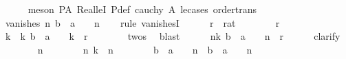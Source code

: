 \begin{isabellebody}
\ \ \ \ \isamarkupfalse%
\ {\isacharparenleft}{\kern0pt}meson\ PA\ Real{\isacharunderscore}{\kern0pt}leI\ P{\isacharunderscore}{\kern0pt}def\ {\isacartoucheopen}cauchy\ A{\isacartoucheclose}\ le{\isacharunderscore}{\kern0pt}cases\ order{\isachardot}{\kern0pt}trans{\isacharparenright}{\kern0pt}\isanewline
\ \ \isamarkupfalse%
\ \isamarkupfalse%
\ {\isachardoublequoteopen}vanishes\ {\isacharparenleft}{\kern0pt}{\isasymlambda}n{\isachardot}{\kern0pt}\ {\isacharparenleft}{\kern0pt}b\ {\isacharminus}{\kern0pt}\ a{\isacharparenright}{\kern0pt}\ {\isacharslash}{\kern0pt}\ {}\ {\isacharcircum}{\kern0pt}\ n{\isacharparenright}{\kern0pt}{\isachardoublequoteclose}\isanewline
\ \ \isamarkupfalse%
\ {\isacharparenleft}{\kern0pt}rule\ vanishesI{\isacharparenright}{\kern0pt}\isanewline
\ \ \ \ \isamarkupfalse%
\ r\ {\isacharcolon}{\kern0pt}{\isacharcolon}{\kern0pt}\ rat\isanewline
\ \ \ \ \isamarkupfalse%
\ {\isachardoublequoteopen}{}\ {\isacharless}{\kern0pt}\ r{\isachardoublequoteclose}\isanewline
\ \ \ \ \isamarkupfalse%
\ \isamarkupfalse%
\ k\ \ k{\isacharcolon}{\kern0pt}\ {\isachardoublequoteopen}{\isasymbar}b\ {\isacharminus}{\kern0pt}\ a{\isasymbar}\ {\isacharslash}{\kern0pt}\ {}\ {\isacharcircum}{\kern0pt}\ k\ {\isacharless}{\kern0pt}\ r{\isachardoublequoteclose}\isanewline
\ \ \ \ \ \ \isamarkupfalse%
\ twos\ \isamarkupfalse%
\ blast\isanewline
\ \ \ \ \isamarkupfalse%
\ {\isachardoublequoteopen}{\isasymforall}n{\isasymge}k{\isachardot}{\kern0pt}\ {\isasymbar}{\isacharparenleft}{\kern0pt}b\ {\isacharminus}{\kern0pt}\ a{\isacharparenright}{\kern0pt}\ {\isacharslash}{\kern0pt}\ {}\ {\isacharcircum}{\kern0pt}\ n{\isasymbar}\ {\isacharless}{\kern0pt}\ r{\isachardoublequoteclose}\isanewline
\ \ \ \ \isamarkupfalse%
\ clarify\isanewline
\ \ \ \ \ \ \isamarkupfalse%
\ n\isanewline
\ \ \ \ \ \ \isamarkupfalse%
\ n{\isacharcolon}{\kern0pt}\ {\isachardoublequoteopen}k\ {\isasymle}\ n{\isachardoublequoteclose}\isanewline
\ \ \ \ \ \ \isamarkupfalse%
\ {\isachardoublequoteopen}{\isasymbar}{\isacharparenleft}{\kern0pt}b\ {\isacharminus}{\kern0pt}\ a{\isacharparenright}{\kern0pt}\ {\isacharslash}{\kern0pt}\ {}\ {\isacharcircum}{\kern0pt}\ n{\isasymbar}\ {\isacharequal}{\kern0pt}\ {\isasymbar}b\ {\isacharminus}{\kern0pt}\ a{\isasymbar}\ {\isacharslash}{\kern0pt}\ {}\ {\isacharcircum}{\kern0pt}\ n{\isachardoublequoteclose}\isanewline

\end{isabellebody}

